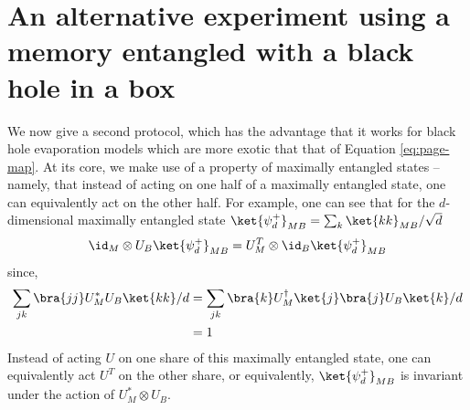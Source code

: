 \documentclass[12pt,a4paper]{article}
\begin{document}
\section{An alternative experiment using a memory entangled with a black hole in a box}
\label{sec:box}

We now give a second protocol, which has the advantage that it works for black hole evaporation models which are more exotic that that of Equation \eqref{eq:page-map}.
At its core, we make use of a  property of maximally entangled states -- namely, that instead of acting on one half of a maximally entangled state, one can equivalently act on the other half. For example, one can see that for the $d$-dimensional maximally entangled state $\ket{\psi^+_d}_{MB}=\sum_k\ket{kk}_{MB}/\sqrt{d}$
\begin{align}
\id_{M}\otimes U_B\ket{\psi^+_d}_{MB}= U_{M}^T\otimes\id_{B}\ket{\psi^+_d}_{MB}
\label{eq:uustar}
\end{align}
since,
\begin{align}
\sum_{jk}\bra{jj}U_M^*U_B\ket{kk}/{d}&=\sum_{jk}\bra{k}U_M^\dagger\ket{j}\bra{j}U_B\ket{k}/{d} \\
&=1
\end{align}
Instead of acting $U$ on one share of this maximally entangled state, one can equivalently act $U^T$ on the other share, or equivalently,  $\ket{\psi^+_d}_{MB}$ is invariant
under the action of $U_M^*\otimes U_B$.

 
\end{document}

